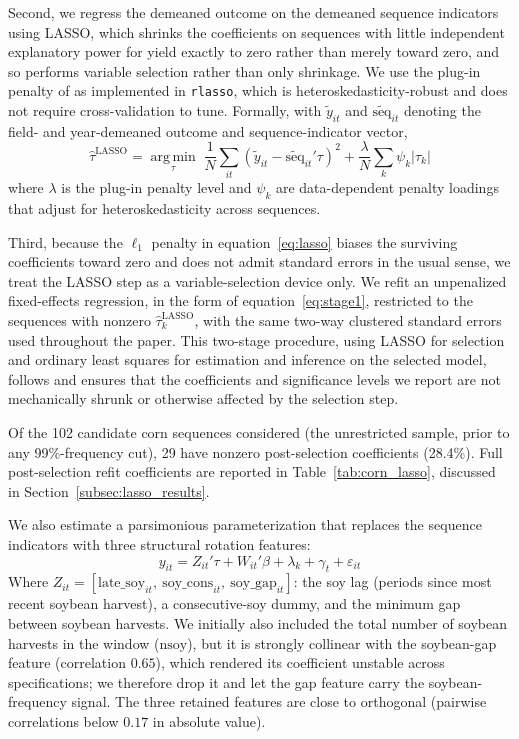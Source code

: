 \documentclass[12pt,letterpaper]{article}
\theoremstyle{remark}
\theoremstyle{remark}
\theoremstyle{plain}
\theoremstyle{definition}
\begin{document}
Second, we regress the demeaned outcome on the demeaned sequence indicators using LASSO, which shrinks the coefficients on sequences with little independent explanatory power for yield exactly to zero rather than merely toward zero, and so performs variable selection rather than only shrinkage. We use the plug-in penalty of \citet{Belloni2014} as implemented in \texttt{rlasso}, which is heteroskedasticity-robust and does not require cross-validation to tune. Formally, with $\tilde{y}_{it}$ and $\tilde{\text{seq}}_{it}$ denoting the field- and year-demeaned outcome and sequence-indicator vector,
%
\begin{equation}
  \hat{\tau}^{\text{LASSO}} = \operatorname*{arg\,min}_{\tau} \; \frac{1}{N}\sum_{it}\left(\tilde{y}_{it} - \tilde{\text{seq}}_{it}'\tau\right)^2 + \frac{\lambda}{N}\sum_{k}\psi_k|\tau_k|
  \label{eq:lasso}
\end{equation}
%
where $\lambda$ is the plug-in penalty level and $\psi_k$ are data-dependent penalty loadings that adjust for heteroskedasticity across sequences.

Third, because the $\ell_1$ penalty in equation~\eqref{eq:lasso} biases the surviving coefficients toward zero and does not admit standard errors in the usual sense, we treat the LASSO step as a variable-selection device only. We refit an unpenalized fixed-effects regression, in the form of equation~\eqref{eq:stage1}, restricted to the sequences with nonzero $\hat{\tau}^{\text{LASSO}}_k$, with the same two-way clustered standard errors used throughout the paper. This two-stage procedure, using LASSO for selection and ordinary least squares for estimation and inference on the selected model, follows \citet{Belloni2014} and ensures that the coefficients and significance levels we report are not mechanically shrunk or otherwise affected by the selection step.

Of the 102 candidate corn sequences considered (the unrestricted sample, prior to any 99\%-frequency cut), 29 have nonzero post-selection coefficients (28.4\%). Full post-selection refit coefficients are reported in Table~\ref{tab:corn_lasso}, discussed in Section~\ref{subsec:lasso_results}.


We also estimate a parsimonious parameterization that replaces the sequence indicators with three structural rotation features:
%
\begin{equation}
  y_{it} = Z_{it}'\tau + W_{it}'\beta + \lambda_k + \gamma_t + \varepsilon_{it}
  \label{eq:zvector}
\end{equation}
%
 Where $Z_{it} = [\text{late\_soy}_{it},\ \text{soy\_cons}_{it},\ \text{soy\_gap}_{it}]$: the soy lag (periods since most recent soybean harvest), a consecutive-soy dummy, and the minimum gap between soybean harvests. We initially also included the total number of soybean harvests in the window ($\text{nsoy}$), but it is strongly collinear with the soybean-gap feature (correlation $0.65$), which rendered its coefficient unstable across specifications; we therefore drop it and let the gap feature carry the soybean-frequency signal. The three retained features are close to orthogonal (pairwise correlations below $0.17$ in absolute value).
 
\end{document}
